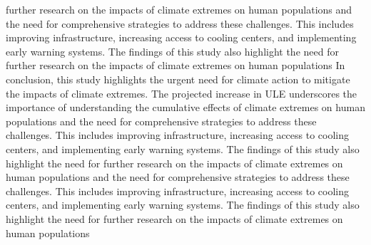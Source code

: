 \documentclass[9pt, twoside, twocolumn]{extarticle}
\begin{document}
further research on the impacts of climate extremes on human populations and the need for comprehensive strategies to address these challenges. This includes improving infrastructure, increasing access to cooling centers, and implementing early warning systems.\cite{IPCC2021} The findings of this study also highlight the need for further research on the impacts of climate extremes on human populations  In conclusion, this study highlights the urgent need for climate action to mitigate the impacts of climate extremes. The projected increase in ULE underscores the importance of understanding the cumulative effects of climate extremes on human populations and the need for comprehensive strategies to address these challenges. This includes improving infrastructure, increasing access to cooling centers, and implementing early warning systems.\cite{IPCC2021} The findings of this study also highlight the need for further research on the impacts of climate extremes on human populations and the need for comprehensive strategies to address these challenges. This includes improving infrastructure, increasing access to cooling centers, and implementing early warning systems.\cite{IPCC2021} The findings of this study also highlight the need for further research on the impacts of climate extremes on human populations  

\fontacknowledgment


\end{document}
